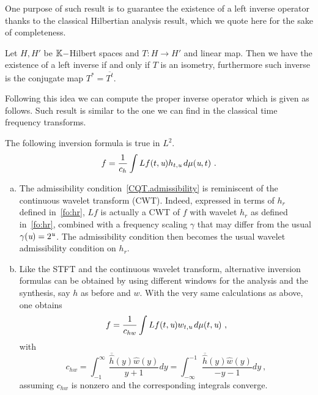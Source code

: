     One purpose of such result is to guarantee the existence of a left inverse operator thanks to the classical Hilbertian analysis result, which we quote here for the sake of completeness.
\begin{prop}
\label{prop_inversion_isometry}
	Let $H,H'$ be $\mathbb{K}-$Hilbert spaces and $T:H\rightarrow H'$ and linear map. Then we have the existence of a left inverse if and only if $T$ is an isometry, furthermore such inverse is the conjugate map $T^*=\overline{T^t}$.
\end{prop}
Following this idea we can compute the proper inverse operator which is given as follows. Such result is similar to the one we can find in the classical time frequency transforms.
\begin{prop}\label{prop_inversion_formula_linear}
    The following inversion formula is true in $L^2$.
    \begin{equation}
f = \frac{1}{c_h}\int Lf(t,\textit{u})h_{t,\textit{u}}\,d\mu(\textit{u},t)\ .
\end{equation}

\end{prop}

\begin{remark}
\begin{enumerate}[(a)]
\item 
The admissibility condition~\eqref{CQT.admissibility} is reminiscent of the continuous wavelet transform (CWT). Indeed, expressed in terms of $h_r$ defined in~\eqref{fo:hr}, $Lf$ is actually a CWT of $f$ with wavelet $h_r$ as defined in~\eqref{fo:hr}, combined with a frequency scaling $\gamma$ that may differ from the usual $\gamma(\textit{u})=2^{\textit{u}}$. The admissibility condition then becomes the usual wavelet admissibility condition on $h_r$.
\item 
Like the STFT and the continuous wavelet transform, alternative inversion formulas can be obtained by using different windows for the analysis and the synthesis, say $h$ as before and $w$. With the very same calculations as above, one obtains
\begin{equation*}
    f = \frac{1}{c_{hw}}\int Lf(t,\textit{u})w_{t,\textit{u}}\,d\mu(t,\textit{u})\ ,
    \end{equation*}with
\begin{equation*}
c_{hw} = \int_{-1}^\infty \frac{\overline{\hat h}(y)\hat w(y)}{y+1} dy= \int_{-\infty}^{-1} \frac{\overline{\hat h}(y)\hat w(y)}{-y-1} dy\ ,
\end{equation*}
assuming $c_{hw}$ is nonzero and the corresponding integrals converge.

\end{enumerate}
\end{remark}